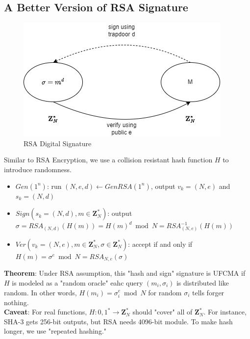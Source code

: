 \documentclass{scribe}
\begin{document}
\subsection{A Better Version of RSA Signature}
\begin{figure}[H]
    \centering
    \includegraphics[scale=0.5]{rsa_signature.jpg}
    \caption{RSA Digital Signature}
\end{figure}
Similar to RSA Encryption, we use a collision resistant hash function $H$ to introduce randomness.
\begin{itemize}
    \item $Gen(1^n)$: run $(N,e,d) \leftarrow GenRSA(1^n)$, output $v_k = (N,e)$ and $s_k = (N,d)$
    \item $Sign(s_k=(N,d), m \in \mathbf{Z}_N^*)$: output $\sigma = RSA_(N,d)(H(m)) = H(m)^d \bmod N = RSA_{(N,e)}^{-1}(H(m))$
    \item $Ver(v_k=(N,e), m \in \mathbf{Z}_N^*, \sigma \in \mathbf{Z}_N^*)$: accept if and only if $H(m) = \sigma^e \bmod N  = RSA_{N,e}(\sigma)$
\end{itemize}
\textbf{Theorem}: Under RSA assumption, this "hash and sign" signature is UFCMA if $H$ is modeled as a "random oracle" eahc query $(m_i, \sigma_i)$ is distributed like random. In other words, $H(m_i) = \sigma_i^e \bmod N$ for random $\sigma_i$ tells forger nothing.
\\
\textbf{Caveat}: For real functions, $H:{0,1}^* \rightarrow \mathbf{Z}_N^*$ should "cover" all of $\mathbf{Z}_N^*$. For instance, SHA-3 gets 256-bit outputs, but RSA needs 4096-bit module. To make hash longer, we use "repeated hashing."
\vspace{10mm}




%

\end{document}
